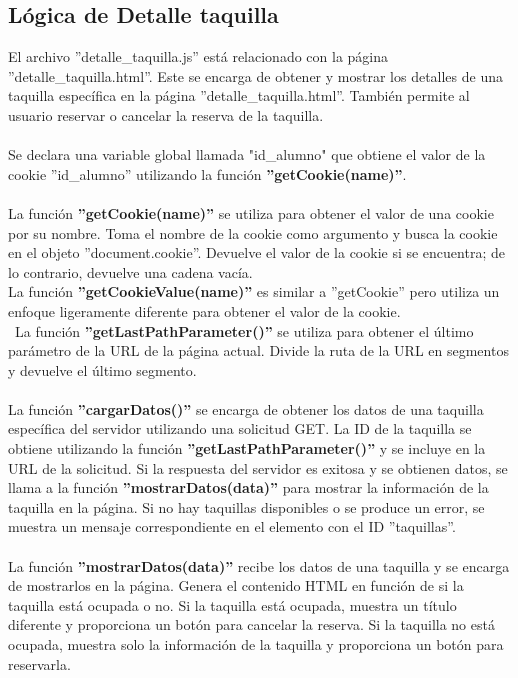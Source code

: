 \documentclass[12pt]{report}
\begin{document}
\subsection{Lógica de Detalle taquilla}
El archivo ''detalle\_taquilla.js'' está relacionado con la página ''detalle\_taquilla.html''. Este se encarga de obtener y mostrar los detalles de una taquilla específica en la página ''detalle\_taquilla.html''. También permite al usuario reservar o cancelar la reserva de la taquilla.\\\\
Se declara una variable global llamada "id\_alumno" que obtiene el valor de la cookie ''id\_alumno'' utilizando la función \textbf{''getCookie(name)''}.
\\\\
La función \textbf{''getCookie(name)''} se utiliza para obtener el valor de una cookie por su nombre. Toma el nombre de la cookie como argumento y busca la cookie en el objeto ''document.cookie''. Devuelve el valor de la cookie si se encuentra; de lo contrario, devuelve una cadena vacía.
\\
La función \textbf{''getCookieValue(name)''} es similar a ''getCookie'' pero utiliza un enfoque ligeramente diferente para obtener el valor de la cookie.
\\\
La función \textbf{''getLastPathParameter()''} se utiliza para obtener el último parámetro de la URL de la página actual. Divide la ruta de la URL en segmentos y devuelve el último segmento.
\\\\
La función \textbf{''cargarDatos()''} se encarga de obtener los datos de una taquilla específica del servidor utilizando una solicitud GET. La ID de la taquilla se obtiene utilizando la función \textbf{''getLastPathParameter()''} y se incluye en la URL de la solicitud. Si la respuesta del servidor es exitosa y se obtienen datos, se llama a la función \textbf{''mostrarDatos(data)''} para mostrar la información de la taquilla en la página. Si no hay taquillas disponibles o se produce un error, se muestra un mensaje correspondiente en el elemento con el ID ''taquillas''.
\\\\
La función \textbf{''mostrarDatos(data)''} recibe los datos de una taquilla y se encarga de mostrarlos en la página. Genera el contenido HTML en función de si la taquilla está ocupada o no. Si la taquilla está ocupada, muestra un título diferente y proporciona un botón para cancelar la reserva. Si la taquilla no está ocupada, muestra solo la información de la taquilla y proporciona un botón para reservarla.
\end{document}
